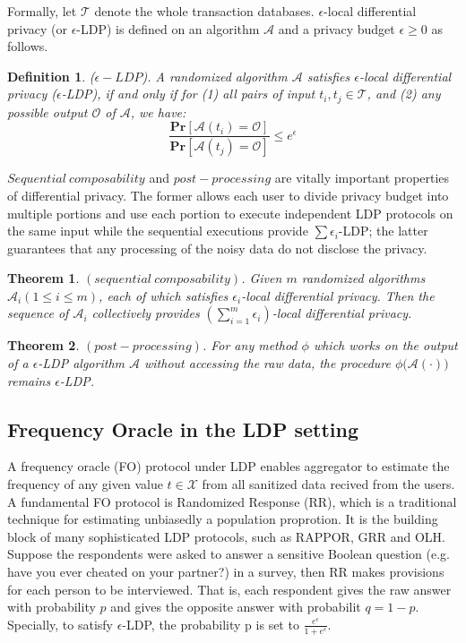 \documentclass[conference]{IEEEtran}
\begin{document}
Formally, let $\mathcal{T}$ denote the whole  transaction databases. $\epsilon$-local differential privacy (or $\epsilon$-LDP) is defined on an algorithm $\mathcal{A}$ and a privacy budget $\epsilon \geq 0$ as follows.

\newtheorem{Definition}{\bf Definition}
\begin{Definition}
($\epsilon-LDP$). A randomized algorithm $\mathcal{A}$ satisfies $\epsilon$-local differential privacy ($\epsilon$-LDP), if and only if for (1) all pairs of input $t_i,t_j \in \mathcal{T}$, and (2) any possible output $\mathcal{O}$ of $\mathcal{A}$, we have:\\
$$\frac{\mathbf{Pr}[\mathcal{A}(t_i)=\mathcal{O}]}{\mathbf{Pr}[\mathcal{A}(t_j)=\mathcal{O}]} \leq e^{\epsilon}$$
\end{Definition}

$Sequential\  composability$\cite{a9} and $post-processing$\cite{post-processing} are vitally important properties of differential privacy. The former allows each user to divide privacy budget into multiple portions and use each portion to execute independent LDP protocols on the same input while the sequential executions provide $\sum \epsilon_i$-LDP; the latter guarantees that any processing of the noisy data do not disclose the privacy.

\newtheorem{theorem}{\bf Theorem}[section]
\begin{theorem}\label{sequential composability}
$(sequential\ composability)$. Given $m$ randomized algorithms $\mathcal{A}_i(1 \leq i \leq m)$, each of which satisfies $\epsilon_i$-local differential privacy. Then the sequence of $\mathcal{A}_i$ collectively provides $(\sum_{i=1}^{m} \epsilon_i)$-local differential privacy. 
\end{theorem}

\begin{theorem}\label{post processing}
$(post-processing)$. For any method $\phi$ which works on the output of a $\epsilon$-LDP algorithm $\mathcal{A}$ without accessing the raw data, the procedure $\phi \big(\mathcal{A(\cdot)} \big)$ remains $\epsilon$-LDP.
\end{theorem}

\subsection{Frequency Oracle in the LDP setting}
A frequency oracle (FO) protocol under LDP enables aggregator to estimate the frequency of any given value $t \in \mathcal{X}$ from all sanitized data recived from the users. A fundamental FO protocol is Randomized Response (RR)\cite{rr}, which is a traditional technique for estimating unbiasedly a population proprotion. It is the building block of many sophisticated LDP protocols, such as RAPPOR\cite{rappor}, GRR and OLH\cite{a8}. Suppose the respondents were asked to answer a sensitive Boolean question (e.g. have you ever cheated on your partner?) in a survey, then RR makes provisions for each person to be interviewed. That is, each respondent gives the raw answer with probability $p$ and gives the opposite answer with probabilit $q = 1-p$. Specially, to satisfy $\epsilon$-LDP, the probability p is set to $\frac{e^{\epsilon}}{1+e^{\epsilon}}$. 
\end{document}
